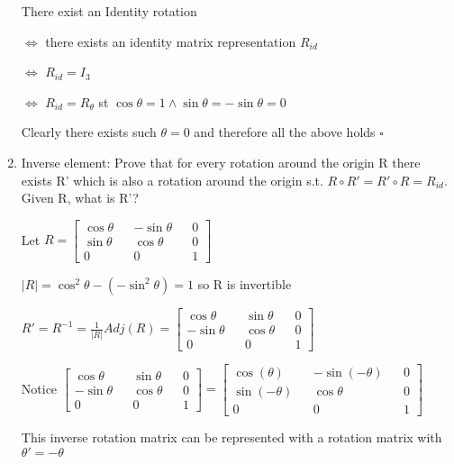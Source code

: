 \documentclass{article}
\begin{document}
\begin{enumerate}
        There exist an Identity rotation 

        $\iff$ there exists an identity matrix representation $R_{id}$ 

        $\iff$ $R_{id} = I_3$ 

        $\iff$ $R_{id} = R_{\theta}$ st $\cos \theta = 1 \wedge \sin \theta = - \sin \theta = 0$ 

        Clearly there exists such $\theta = 0 $ and therefore all the above holds $\square$

        \item Inverse element: Prove that for every rotation around the origin R there exists R' which is also a rotation around the origin s.t. $R \circ R' = R' \circ R = R_{id}$. Given R, what is R'?
        
        Let $R = \begin{bmatrix}
            \cos \theta && - \sin \theta && 0 \\ 
            \sin \theta && \cos \theta && 0 \\
            0  && 0  && 1 
        \end{bmatrix}$
        
        $|R| = \cos^2 \theta - (- \sin^2 \theta) = 1$ so R is invertible

        $R' = R^{-1} = \frac{1}{|R|} Adj(R) = \begin{bmatrix}
            \cos \theta && \sin \theta && 0 \\ 
            - \sin \theta && \cos \theta && 0 \\
            0  && 0  && 1 
        \end{bmatrix}$

        Notice $\begin{bmatrix}
            \cos \theta && \sin \theta && 0 \\ 
            - \sin \theta && \cos \theta && 0 \\
            0  && 0  && 1 
        \end{bmatrix} = \begin{bmatrix}
            \cos (\theta) && - \sin (- \theta) && 0 \\ 
            \sin (-\theta) && \cos \theta && 0 \\
            0  && 0  && 1 
        \end{bmatrix}$ 
        
        This inverse rotation matrix can be represented with a rotation matrix with $\theta' = -\theta$


\end{enumerate}
\end{document}
